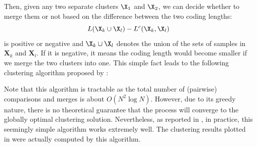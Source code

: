 \documentclass[../../book-main.tex]{subfiles}
\begin{document}
Then, given any two separate clusters $\X_1$ and $\X_2$, we can decide whether to merge them or not based on the difference between the two coding lengths:
\begin{equation}
	L(\X_k \cup \X_l) - L^c(\X_k, \X_l)
\end{equation}
is positive or negative and $\X_k \cup \X_l$ denotes the union of the sets of samples in $\bm X_k$ and $\bm X_l$. If it is negative, it means the coding length would become smaller if we merge the two clusters into one. This simple fact leads to the following clustering algorithm proposed by \cite{ma2007segmentation}:
\begin{algorithm}[!htbp]
	\caption{Pairwise Steepest Descent of Coding Length}\label{alg:steepest_descent_coding_length}
	\begin{algorithmic}[1]

		 
		 
		\State{\Return{\(\cC\)}} 
		\Else
		 
		 
		\EndIf
		\EndWhile
		\State{\Return{\(\cC\)}}  
		\EndProcedure
	\end{algorithmic}
\end{algorithm}

Note that this algorithm is tractable as the total number of (pairwise) comparisons and merges is about $O(N^2\log N)$. However, due to its greedy nature, there is no theoretical guarantee that the process will converge to the globally optimal clustering solution. Nevertheless, as reported in \cite{ma2007segmentation}, in practice, this seemingly simple algorithm works extremely well. The clustering results plotted in  were actually computed by this algorithm.
\end{document}
